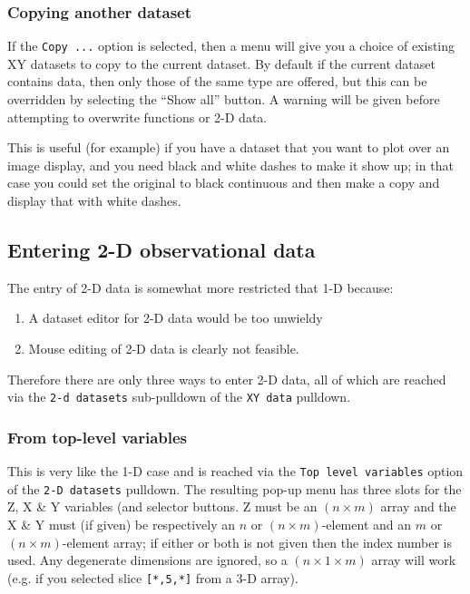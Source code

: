 \documentclass[11pt,twoside,english]{article}
\begin{document}
\subsubsection{Copying another dataset}
\label{sec:xycopy}

If the \texttt{Copy ...} option is selected, then a menu will give you
a choice of existing XY datasets to copy to the current dataset. By
default if the current dataset contains data, then only those of the
same type are offered, but this can be overridden by selecting the
``Show all'' button. A warning will be given before attempting to
overwrite functions or 2-D data.

This is useful (for example) if you have a dataset that you want to
plot over an image display, and you need black and white dashes to make
it show up; in that case you could set the original to black continuous
and then make a copy and display that with white dashes.


\subsection{Entering 2-D observational data\label{enter-2d}}

The entry of 2-D data is somewhat more restricted that 1-D because:

\begin{enumerate}
\item A dataset editor for 2-D data would be too unwieldy
\item Mouse editing of 2-D data is clearly not feasible.
\end{enumerate}
Therefore there are only three ways to enter 2-D data, all of which are
reached via the \texttt{2-d datasets} sub-pulldown of the \texttt{XY
  data} pulldown.


\subsubsection{From top-level variables }

This is very like the 1-D case and is reached via the \texttt{Top level
  variables} option of the \texttt{2-D datasets} pulldown. The
resulting pop-up menu has three slots for the Z, X \& Y variables (and
selector buttons.  Z must be an $(n\times m)$ array and the X \& Y must
(if given) be respectively an $n$ or $(n\times m)$-element and an $m$
or $(n\times m)$-element array; if either or both is not given then the
index number is used. Any degenerate dimensions are ignored, so a
$(n\times 1 \times m)$ array will work (e.g. if you selected slice
\texttt{[*,5,*]} from a 3-D array).
\end{document}
